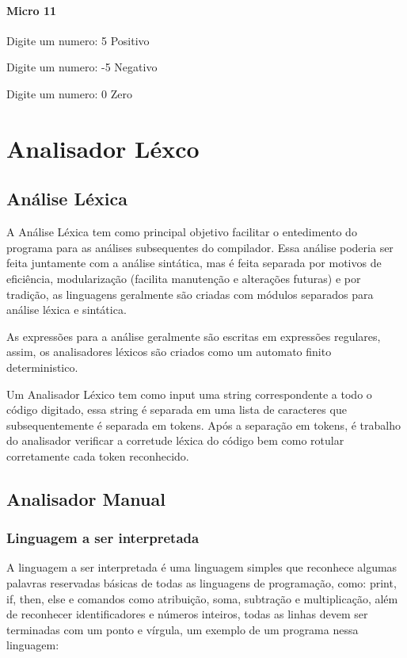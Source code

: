 \documentclass[12pt,a4paper,twoside]{report}
\begin{document}
\subsubsection{Micro 11}


\begin{terminal}
Digite um numero: 5
Positivo

Digite um numero: -5
Negativo

Digite um numero: 0
Zero
\end{terminal}

\chapter{Analisador Léxco}
\section{Análise Léxica}

A Análise Léxica tem como principal objetivo facilitar o entedimento do programa para as análises subsequentes do compilador. Essa análise poderia ser feita juntamente com a análise sintática, mas é feita separada por motivos de eficiência, modularização (facilita manutenção e alterações futuras) e por tradição, as linguagens geralmente são criadas com módulos separados para análise léxica e sintática.

As expressões para a análise geralmente são escritas em expressões regulares, assim, os analisadores léxicos são criados como um automato finito deterministico.

Um Analisador Léxico tem como input uma string correspondente a todo o código digitado, essa string é separada em uma lista de caracteres que subsequentemente é separada em tokens. Após a separação em tokens, é trabalho do analisador verificar a corretude léxica do código bem como rotular corretamente cada token reconhecido.

\section{Analisador Manual}
\subsection{Linguagem a ser interpretada}
A linguagem a ser interpretada é uma linguagem simples que reconhece algumas palavras reservadas básicas de todas as linguagens de programação, como: print, if, then, else e comandos como atribuição, soma, subtração e multiplicação, além de reconhecer identificadores e números inteiros, todas as linhas devem ser terminadas com um ponto e vírgula, um exemplo de um programa nessa linguagem:
\end{document}
